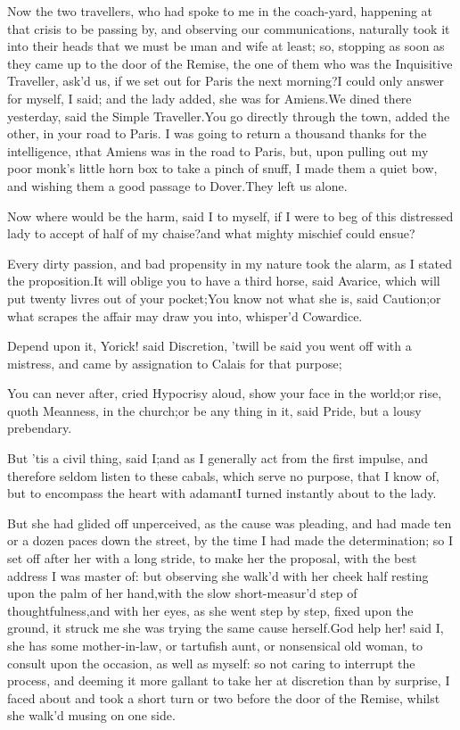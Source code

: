 \documentclass[twoside]{article}
\begin{document}
Now the two travellers, who had spoke to me in the coach-yard, happening
at that crisis to be passing by, and observing our communications,
naturally took it into their heads that we must be \i{man and wife} at
least; so, stopping as soon as they came up to the door of the Remise,
the one of them who was the Inquisitive Traveller, ask’d us, if we set
out for Paris the next morning?\tsk I could only answer for myself, I said;
and the lady added, she was for Amiens.\tsk We dined there yesterday, said
the Simple Traveller.\tsk You go directly through the town, added the other,
in your road to Paris.  I was going to return a thousand thanks for the
intelligence, \i{that Amiens was in the road to Paris}, but, upon pulling
out my poor monk’s little horn box to take a pinch of snuff, I made them
a quiet bow, and wishing them a good passage to Dover.\tsk They left us
alone.\tsk 

\tsk Now where would be the harm, said I to myself, if I were to beg of this
distressed lady to accept of half of my chaise?\tsk and what mighty mischief
could ensue?

Every dirty passion, and bad propensity in my nature took the alarm, as I
stated the proposition.\tsk It will oblige you to have a third horse, said
Avarice, which will put twenty livres out of your pocket;\tsk You know not
what she is, said Caution;\tsk or what scrapes the affair may draw you into,
whisper’d Cowardice.\tsk 

Depend upon it, Yorick! said Discretion, ’twill be said you went off with
a mistress, and came by assignation to Calais for that purpose;\tsk 

\tsk You can never after, cried Hypocrisy aloud, show your face in the
world;\tsk or rise, quoth Meanness, in the church;\tsk or be any thing in it,
said Pride, but a lousy prebendary.

But ’tis a civil thing, said I;\tsk and as I generally act from the first
impulse, and therefore seldom listen to these cabals, which serve no
purpose, that I know of, but to encompass the heart with adamant\tsk I turned
instantly about to the lady.\tsk 

\tsk But she had glided off unperceived, as the cause was pleading, and had
made ten or a dozen paces down the street, by the time I had made the
determination; so I set off after her with a long stride, to make her the
proposal, with the best address I was master of: but observing she walk’d
with her cheek half resting upon the palm of her hand,\tsk with the slow
short-measur’d step of thoughtfulness,\tsk and with her eyes, as she went
step by step, fixed upon the ground, it struck me she was trying the same
cause herself.\tsk God help her! said I, she has some mother-in-law, or
tartufish aunt, or nonsensical old woman, to consult upon the occasion,
as well as myself: so not caring to interrupt the process, and deeming it
more gallant to take her at discretion than by surprise, I faced about
and took a short turn or two before the door of the Remise, whilst she
walk’d musing on one side.
\end{document}
